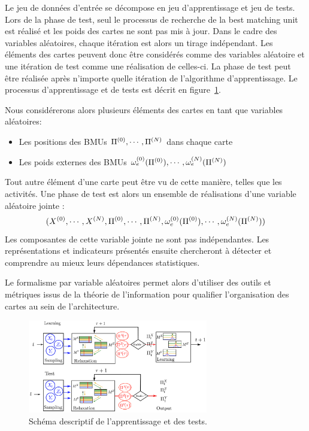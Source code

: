 Le jeu de données d'entrée se décompose en jeu d'apprentissage et jeu de tests. Lors de la phase de test, seul le processus de recherche de la best matching unit est réalisé et les poids des cartes ne sont pas mis à jour. Dans le cadre des variables aléatoires, chaque itération est alors un tirage indépendant. Les éléments des cartes peuvent donc être considérés comme des variables aléatoire et une itération de test comme une réalisation de celles-ci. La phase de test peut être réalisée après n'importe quelle itération de l'algorithme d'apprentissage. Le processus d'apprentissage et de tests est décrit en figure~\ref{fig:flowchart}.

Nous considérerons alors plusieurs éléments des cartes en tant que variables aléatoires:  
\begin{itemize}
\item Les positions des BMUs $\Pi^{({0})}, \cdots, \Pi^{({N})}$ dans chaque carte
\item Les poids externes des BMUs $\omega_e^{({0})}(\Pi^{({0})}), \cdots, \omega_e^{({N})}(\Pi^{({N})})$
\end{itemize}
Tout autre élément d'une carte peut être vu de cette manière, telles que les activités. 
Une phase de test est alors un ensemble de réalisations d'une variable aléatoire jointe : 
$$(X^{({0})}, \cdots, X^{({N})}, \Pi^{({0})}, \cdots, \Pi^{({N})}, \omega_e^{({0})}(\Pi^{({0})}), \cdots, \omega_e^{({N})}(\Pi^{({N})}))$$
Les composantes de cette variable jointe ne sont pas indépendantes. Les représentations et indicateurs présentés ensuite chercheront à détecter et comprendre au mieux leurs dépendances statistiques.

Le formalisme par variable aléatoires permet alors d'utiliser des outils et métriques issus de la théorie de l'information pour qualifier l'organisation des cartes au sein de l'architecture.

\begin{figure}
\centering
\includegraphics[width=0.7\textwidth]{learning_tests_nopred.pdf}
\caption{Schéma descriptif de l'apprentissage et des tests.}
\label{fig:flowchart}
\end{figure}


